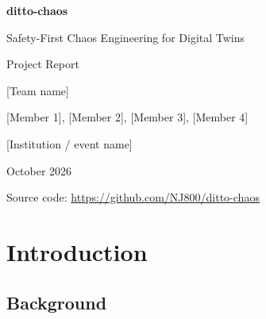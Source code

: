 \documentclass[11pt,a4paper]{article}
\newcommand{\teamname}{[Team name]}
\newcommand{\teammembers}{[Member 1], [Member 2], [Member 3], [Member 4]}
\newcommand{\institution}{[Institution / event name]}
\newcommand{\reportdate}{October 2026}
\begin{document}
\begin{titlepage}
  \centering
  \vspace*{3cm}
  {\Huge\bfseries\color{accent} ditto-chaos\par}
  \vspace{0.6cm}
  {\Large Safety-First Chaos Engineering for Digital Twins\par}
  \vspace{2cm}
  {\large Project Report\par}
  \vspace{2.5cm}
  {\large \teamname\par}
  \vspace{0.3cm}
  {\teammembers\par}
  \vspace{1.5cm}
  {\institution\par}
  \vspace{0.3cm}
  {\reportdate\par}
  \vfill
  {\small Source code: \url{https://github.com/NJ800/ditto-chaos}\par}
\end{titlepage}

\begin{abstract}
\noindent
ditto-chaos is a chaos-engineering tool for Eclipse Ditto, an open-source
digital-twin platform. It injects one controlled fault at a time into a local
Ditto sandbox, measures the effect with the same signals an on-call engineer
would use, and stops and rolls back automatically when a safety limit is
crossed. Every rollback is verified by inspecting the system, not assumed from
a command's exit code. After each experiment the tool produces findings and
recommended fixes. Artificial intelligence is optional and never makes a safety
decision: deterministic code authorizes, stops and reverts every experiment.
In a live run, six fault types were injected in sequence; all six were rolled
back and verified, and Ditto recovered in 2 to 22 seconds. The system is
covered by 547 automated backend tests and 85 frontend tests.
\end{abstract}

\tableofcontents
\newpage

\section{Introduction}

\subsection{Background}
\end{document}
